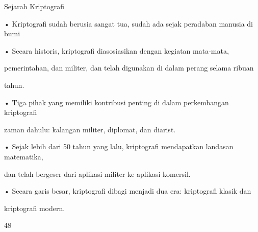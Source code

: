 \documentclass{article}
\begin{document}

Sejarah Kriptografi

• Kriptografi sudah berusia sangat tua, sudah ada sejak peradaban manusia di bumi

• Secara historis, kriptografi diasosiasikan dengan kegiatan mata-mata, 

pemerintahan, dan militer, dan telah digunakan di dalam perang selama ribuan 

tahun.

• Tiga pihak yang memiliki kontribusi penting di dalam perkembangan kriptografi 

zaman dahulu: kalangan militer, diplomat, dan diarist.

• Sejak lebih dari 50 tahun yang lalu, kriptografi mendapatkan landasan matematika, 

dan telah bergeser dari aplikasi militer ke aplikasi komersil. 

• Secara garis besar, kriptografi dibagi menjadi dua era: kriptografi klasik dan 

kriptografi modern.

48
\end{document}
